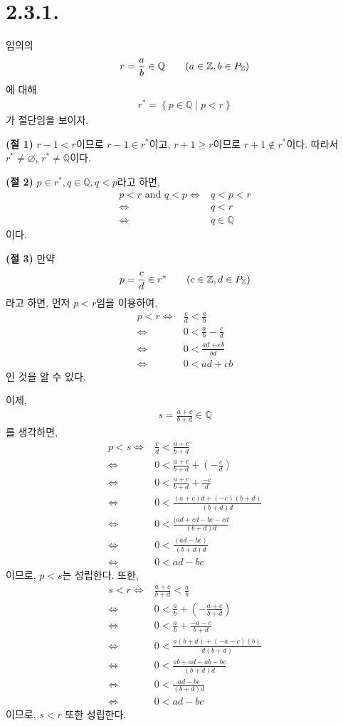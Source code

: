 \documentclass{article}
\begin{document}
\section{2.3.1.}
임의의 
\begin{align*}
r = \frac{a}{b} \in \mathbb{Q} \tag{$a \in \mathbb{Z}, b \in P_{\mathbb{Z}} $}
\end{align*}
에 대해
\begin{align*}
r^* = \left\{ p \in \mathbb{Q} \mid p < r \right\}
\end{align*}가 절단임을 보이자.

\textbf{(절 1)} $r-1 < r$이므로 $r-1 \in r^*$이고, $r+1 \ge r$이므로 $r+1 \notin r^*$이다.
따라서 $r^* \neq \varnothing$, $r^* \neq \mathbb{Q}$이다.

\textbf{(절 2)} $p \in r^*, q \in \mathbb{Q}, q < p$라고 하면,
\begin{align*}
p < r \text{ and } q < p \iff& q < p < r
\\ \iff& q < r
\\ \iff& q \in \mathbb{Q}
\end{align*}이다.

\textbf{(절 3)} 만약
\begin{align*}
p = \frac{c}{d} \in r^* \tag{$c \in \mathbb{Z}, d \in P_{\mathbb{Z}}$}
\end{align*}라고 하면, 먼저 $p < r$임을 이용하여,
\begin{align*}
p < r \iff& \frac{c}{d} < \frac{a}{b}
\\ \iff& 0 < \frac{a}{b} - \frac{c}{d}
\\ \iff& 0 < \frac{ad+cb}{bd}
\\ \iff& 0 < ad+cb \tag{$\because 0 < bd$}
\end{align*}인 것을 알 수 있다.

이제,
\begin{align*}
s = \frac{a+c}{b+d} \in \mathbb{Q}
\end{align*}를 생각하면,
\begin{align*}
p < s \iff& \frac{c}{d} < \frac{a+c}{b+d}
\\ \iff& 0 < \frac{a+c}{b+d} + (- \frac{c}{d})
\\ \iff& 0 < \frac{a+c}{b+d} + \frac{-c}{d}
\\ \iff& 0 < \frac{(a+c)d+(-c)(b+d)}{(b+d)d}
\\ \iff& 0 < \frac{(ad+cd-bc-cd}{(b+d)d}
\\ \iff& 0 < \frac{(ad-bc)}{(b+d)d}
\\ \iff& 0 < ad-bc \tag{$0 < (b+d)d$}
\end{align*}이므로, $p<s$는 성립한다. 또한,
\begin{align*}
s < r \iff& \frac{a+c}{b+d} < \frac{a}{b}
\\ \iff& 0 < \frac{a}{b} + (-\frac{a+c}{b+d})
\\ \iff& 0 < \frac{a}{b} + \frac{-a-c}{b+d}
\\ \iff& 0 < \frac{a(b+d)+(-a-c)(b)}{d(b+d)}
\\ \iff& 0 < \frac{ab+ad-ab-bc}{(b+d)d}
\\ \iff& 0 < \frac{ad-bc}{(b+d)d}
\\ \iff& 0 < ad-bc \tag{$0 < (b+d)d$}
\end{align*}이므로, $s<r$ 또한 성립한다.
\end{document}
